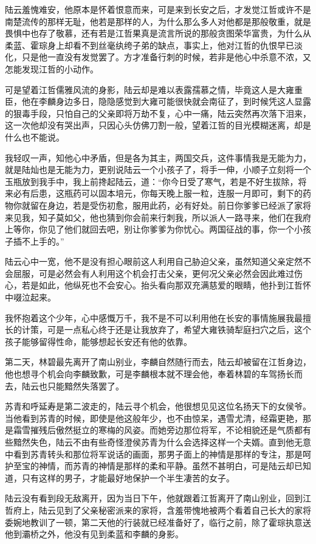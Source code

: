 陆云羞愧难安，他原本是怀着恨意而来，可是来到长安之后，才发觉江哲或许不是南楚流传的那样无耻，他若是那样的人，为什么那么多人对他都是那般敬重，就是畏惧中也存了敬慕，还有若是江哲果真是流言所说的那般贪图荣华富贵，为什么从柔蓝、霍琮身上却看不到丝毫纨绔子弟的缺点，事实上，他对江哲的仇恨早已淡化，只是他一直没有发觉罢了。方才准备行刺的时候，若非是他心中杀意不浓，又怎能发现江哲的小动作。

可是望着江哲儒雅风流的身影，陆云却是难以表露孺慕之情，毕竟这人是大雍重臣，他在李麟身边多日，隐隐感觉到大雍可能很快就会南征了，到时候凭这人显露的狠毒手段，只怕自己的父亲即将万劫不复，心中一痛，陆云突然再次落下泪来，这一次他却没有哭出声，只因心头仿佛刀割一般，望着江哲的目光模糊迷离，却是什么也不能说。

我轻叹一声，知他心中矛盾，但是各为其主，两国交兵，这件事情我是无能为力，就是陆灿也是无能为力，更别说陆云一个小孩子了，将手一伸，小顺子立刻将一个玉瓶放到我手中，我上前搀起陆云，道：“你今日受了寒气，若是不好生拔除，将来必有后患，这瓶药可以固本培元，你每天晚上服一粒，连服一月即可，剩下的药物你就留在身边，若是受伤初愈，服用此药，必有好处。前日你爹爹已经派了家将来见我，知子莫如父，他也猜到你会前来行刺我，所以派人一路寻来，他们在我府上等你，你见了他们就回去吧，别让你爹爹为你忧心。两国征战的事，你一个小孩子插不上手的。”

陆云心中一宽，他不是没有担心眼前这人利用自己胁迫父亲，虽然知道父亲定然不会屈服，可是必然会有人利用这个机会打击父亲，更何况父亲必然会因此难过伤心，若是如此，他纵死也不会安心。抬头看向那双充满慈爱的眼睛，他扑到江哲怀中啜泣起来。

我怀抱着这个少年，心中感慨万千，我不是不可以利用他在长安的事情施展我最擅长的计策，可是一点私心终于还是让我放弃了，希望大雍铁骑犁庭扫穴之后，这个孩子能够留得性命，能够想起长安还有他的依靠。

第二天，林碧最先离开了南山别业，李麟自然随行而去，陆云却被留在江哲身边，他也想寻个机会向李麟致歉，可是李麟根本就不理会他，奉着林碧的车驾扬长而去，陆云也只能黯然失落罢了。

苏青和呼延寿是第二波走的，陆云寻个机会，他很想见见这位名扬天下的女侯爷。当他看到苏青的时候，即使是他这般年少，也不由惊呆，遇雪尤清，经霜更艳，那是霜雪摧残后傲然挺立的寒梅的风姿。而她旁边那位将军，不论相貌还是气质都有些黯然失色，陆云不由有些奇怪澄侯苏青为什么会选择这样一个夫婿。直到他无意中看到苏青转头和那位将军说话的画面，那男子面上的神情是那样的专注，那是呵护至宝的神情，而苏青的神情是那样的柔和平静。虽然不甚明白，可是陆云却已知道，只有这样的男子，才能最好地保护一个半生凄苦的女子。

陆云没有看到段无敌离开，因为当日下午，他就跟着江哲离开了南山别业，回到江哲府上，陆云见到了父亲秘密派来的家将，含羞带愧地被两个看着自己长大的家将委婉地教训了一顿，第二天他的行装就已经准备好了，临行之前，除了霍琮执意送他到灞桥之外，他没有见到柔蓝和李麟的身影。

